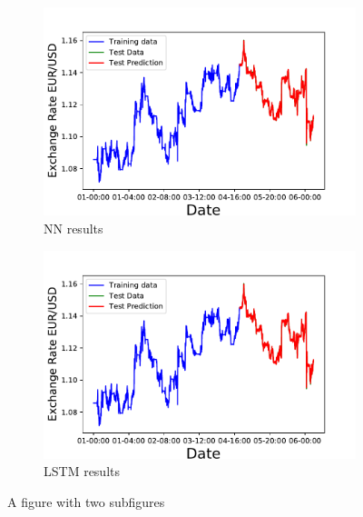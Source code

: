 \documentclass[10pt,a4paper]{article}
\begin{document}
\begin{figure}[h]
\centering
\begin{subfigure}{.5\textwidth}
  \centering
  \includegraphics[scale=0.41]{EURO_USD_exchange_rate_NN.pdf}
  \caption{NN results}
  \label{fig:sub1}
\end{subfigure}%
\begin{subfigure}{.5\textwidth}
  \centering
  \includegraphics[scale=0.41]{EURO_USD_exchange_rate_LSTN.pdf}
  \caption{LSTM results}
  \label{fig:sub2}
\end{subfigure}
\caption{A figure with two subfigures}
\label{fig:test}
\end{figure}
\end{document}
